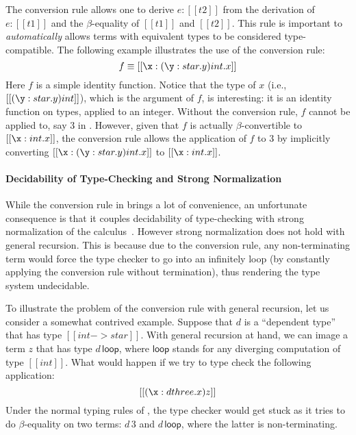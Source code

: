 
The conversion rule allows one to derive $e:[[t2]]$ from the
derivation of $e:[[t1]]$ and the $\beta$-equality of $[[t1]]$ and
$[[t2]]$. This rule is important to \emph{automatically} allows terms
with equivalent types to be considered type-compatible.  The following
example illustrates the use of the conversion rule:
\[
f \equiv [[\x:(\y:star.y)int.x]]
\]
Here $f$ is a simple identity function. Notice that the type of $x$
(i.e., $[[(\y:star.y)int]]$), which is the argument of $f$, is
interesting: it is an identity function on types, applied to an
integer.  Without the conversion rule, $f$ cannot be applied to, say
$3$ in \coc. However, given that $f$ is actually $\beta$-convertible
to $[[\x:int.x]]$, the conversion rule allows the application of $f$
to $3$ by implicitly converting $[[\x:(\y:star.y)int.x]]$ to
$[[\x:int.x]]$.

\paragraph{Decidability of Type-Checking and Strong Normalization} 
While the conversion rule in \coc brings a lot of convenience, an
unfortunate consequence is that it couples decidability of
type-checking with strong normalization of the
calculus~\cite{coc:decidability}.  However strong normalization does
not hold with general recursion. This is because due to the conversion
rule, any non-terminating term would force the type checker to go into
an infinitely loop (by constantly applying the conversion rule without
termination), thus rendering the type system undecidable.

To illustrate the problem of the conversion rule with general
recursion, let us consider a somewhat contrived example. Suppose that
$d$ is a ``dependent type'' that has type $[[int -> star]]$. With
general recursion at hand, we can image a term $z$ that has type
$d\,\mathsf{loop}$, where $\mathsf{loop}$ stands for any diverging
computation of type $[[int]]$. What would happen if we try to type
check the following application: \[ [[(\x: d three.x)z]]\]
Under the normal typing rules of \coc, the type checker would get
stuck as it tries to do $\beta$-equality on two terms: $d\,3$ and
$d\,\mathsf{loop}$, where the latter is non-terminating.   

